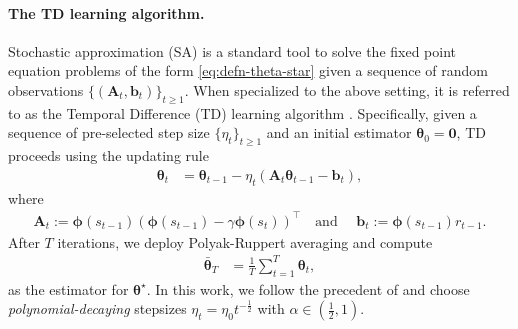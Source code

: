 \paragraph{The TD learning algorithm.} 
Stochastic approximation (SA) is a standard tool to solve the fixed point equation problems of the form \eqref{eq:defn-theta-star} given a sequence of random observations $\{(\bm{A}_t, \bm{b}_t)\}_{t\geq 1}.$
When specialized to the above setting, it is referred to as the Temporal Difference (TD) learning algorithm \citep{sutton1988learning}. 
Specifically, given a sequence of pre-selected step size $\{\eta_t\}_{t\geq 1}$ and an initial estimator $\bm{\theta}_0 = \bm{0}$, TD proceeds using the updating rule 
	\label{eq:TD-update-all} 
	\begin{align}
	\bm{\theta}_{t} & =\bm{\theta}_{t-1}-\eta_{t}(\bm{A}_{t}\bm{\theta}_{t-1}-\bm{b}_{t}),
	\label{eq:TD-update-rule}
\end{align}
where 
\begin{align}
\bm{A}_{t}  :=\bm{\phi}(s_{t-1})\left(\bm{\phi}(s_{t-1})-\gamma\bm{\phi}(s_{t})\right)^{\top} \quad
\text{and }\quad \bm{b}_{t} :=\bm{\phi}(s_{t-1})r_{t-1}.\label{eq:defn-At}
\end{align}
After $T$ iterations, we deploy Polyak-Ruppert averaging \citep{polyak1992acceleration,ruppert1988efficient} and compute 
\begin{align}
	\label{eq:TD-averaging}
	\bar{\bm{\theta}}_T & =\frac{1}{T}\sum_{t=1}^{T}\bm{\theta}_{t}, 
\end{align}
as the estimator for $\bm{\theta}^\star$. In this work, we follow the precedent of \cite{polyak1992acceleration,ruppert1988efficient} and choose \emph{polynomial-decaying} stepsizes $\eta_t = \eta_0 t^{-\frac{1}{2}}$ with $\alpha \in (\frac{1}{2},1)$. %





